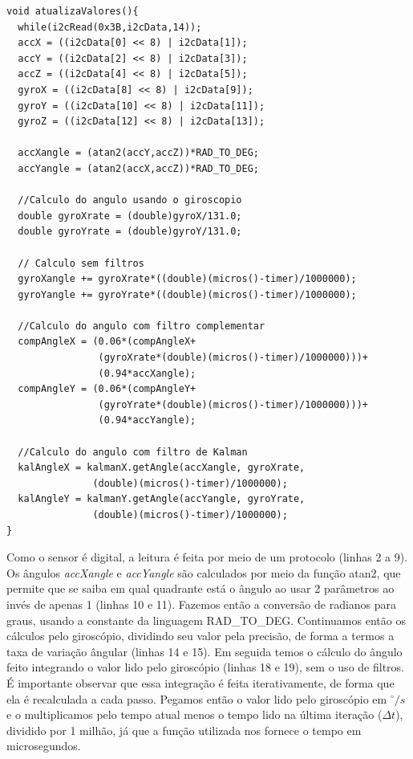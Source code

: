 \documentclass[a4paper,12pt]{article}
\begin{document}
{\singlespace\begin{lstlisting}
void atualizaValores(){
  while(i2cRead(0x3B,i2cData,14));
  accX = ((i2cData[0] << 8) | i2cData[1]);
  accY = ((i2cData[2] << 8) | i2cData[3]);
  accZ = ((i2cData[4] << 8) | i2cData[5]);
  gyroX = ((i2cData[8] << 8) | i2cData[9]);
  gyroY = ((i2cData[10] << 8) | i2cData[11]);
  gyroZ = ((i2cData[12] << 8) | i2cData[13]);
  
  accXangle = (atan2(accY,accZ))*RAD_TO_DEG;
  accYangle = (atan2(accX,accZ))*RAD_TO_DEG;
  
  //Calculo do angulo usando o giroscopio
  double gyroXrate = (double)gyroX/131.0;
  double gyroYrate = (double)gyroY/131.0;
  
  // Calculo sem filtros  
  gyroXangle += gyroXrate*((double)(micros()-timer)/1000000);
  gyroYangle += gyroYrate*((double)(micros()-timer)/1000000);
    
  //Calculo do angulo com filtro complementar
  compAngleX = (0.06*(compAngleX+
                (gyroXrate*(double)(micros()-timer)/1000000)))+
                (0.94*accXangle);
  compAngleY = (0.06*(compAngleY+
                (gyroYrate*(double)(micros()-timer)/1000000)))+
                (0.94*accYangle);
  
  //Calculo do angulo com filtro de Kalman
  kalAngleX = kalmanX.getAngle(accXangle, gyroXrate, 
               (double)(micros()-timer)/1000000);
  kalAngleY = kalmanY.getAngle(accYangle, gyroYrate, 
               (double)(micros()-timer)/1000000); 
}
\end{lstlisting}}

Como o sensor é digital, a leitura é feita por meio de um protocolo (linhas 2 a 9). Os ângulos \textit{accXangle} e \textit{accYangle} são calculados por meio da função atan2, que permite que se saiba em qual quadrante está o ângulo ao usar 2 parâmetros ao invés de apenas 1 (linhas 10 e 11). Fazemos então a conversão de radianos para graus, usando a constante da linguagem RAD\_TO\_DEG. Continuamos então os cálculos pelo giroscópio, dividindo seu valor pela precisão, de forma a termos a taxa de variação ângular (linhas 14 e 15). Em seguida temos o cálculo do ângulo feito integrando o valor lido pelo giroscópio (linhas 18 e 19), sem o uso de filtros. É importante observar que essa integração é feita iterativamente, de forma que ela é recalculada a cada passo. Pegamos então o valor lido pelo giroscópio em $^\circ/s$ e o multiplicamos pelo tempo atual menos o tempo lido na última iteração ($\Delta t$), dividido por 1 milhão, já que a função utilizada nos fornece o tempo em microsegundos.
\end{document}
